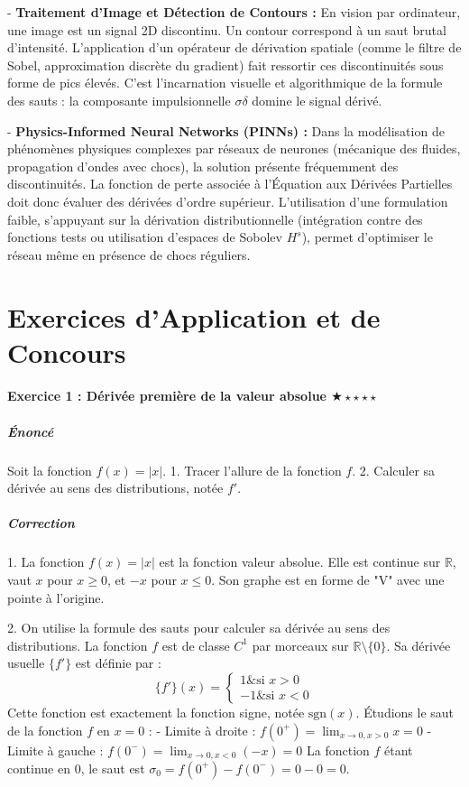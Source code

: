\documentclass[11pt,a4paper]{article}
\begin{document}
- \textbf{Traitement d'Image et Détection de Contours :}
En vision par ordinateur, une image est un signal 2D discontinu. Un contour correspond à un saut brutal d'intensité. L'application d'un opérateur de dérivation spatiale (comme le filtre de Sobel, approximation discrète du gradient) fait ressortir ces discontinuités sous forme de pics élevés. C'est l'incarnation visuelle et algorithmique de la formule des sauts : la composante impulsionnelle $\sigma \delta$ domine le signal dérivé.

- \textbf{Physics-Informed Neural Networks (PINNs) :}
Dans la modélisation de phénomènes physiques complexes par réseaux de neurones (mécanique des fluides, propagation d'ondes avec chocs), la solution présente fréquemment des discontinuités. La fonction de perte associée à l'Équation aux Dérivées Partielles doit donc évaluer des dérivées d'ordre supérieur. L'utilisation d'une formulation faible, s'appuyant sur la dérivation distributionnelle (intégration contre des fonctions tests ou utilisation d'espaces de Sobolev $H^s$), permet d'optimiser le réseau même en présence de chocs réguliers.


\newpage
\part{Exercices d'Application et de Concours}
\subsection*{Exercice 1 : Dérivée première de la valeur absolue  \quad$\bigstar\star\star\star\star$}


\subsubsection*{Énoncé}
Soit la fonction $f(x) = |x|$.
1. Tracer l'allure de la fonction $f$.
2. Calculer sa dérivée au sens des distributions, notée $f'$.

\subsubsection*{Correction}
1. La fonction $f(x) = |x|$ est la fonction valeur absolue. Elle est continue sur $\mathbb{R}$, vaut $x$ pour $x \ge 0$, et $-x$ pour $x \le 0$. Son graphe est en forme de "V" avec une pointe à l'origine.

2. On utilise la formule des sauts pour calculer sa dérivée au sens des distributions.
La fonction $f$ est de classe $C^1$ par morceaux sur $\mathbb{R} \setminus \{0\}$.
Sa dérivée usuelle $\{f'\}$ est définie par :
$$
\{f'\}(x) = \begin{cases}
1 \& \text{si } x > 0 \\
-1 \& \text{si } x < 0
\end{cases}
$$
Cette fonction est exactement la fonction signe, notée $\text{sgn}(x)$.
Étudions le saut de la fonction $f$ en $x = 0$ :
- Limite à droite : $f(0^+) = \lim_{x \to 0, x>0} x = 0$
- Limite à gauche : $f(0^-) = \lim_{x \to 0, x<0} (-x) = 0$
La fonction $f$ étant continue en $0$, le saut est $\sigma_0 = f(0^+) - f(0^-) = 0 - 0 = 0$.
\end{document}
